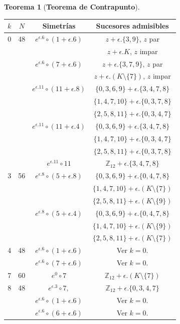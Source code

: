 \documentclass[letterpaper,12pt]{book}
\theoremstyle{definition} \newtheorem{Def}{Definición}[chapter]
\theoremstyle{definition} \newtheorem{Teo}{Teorema}[chapter]
\theoremstyle{definition} \newtheorem{Pro}{Proposición}[chapter]
\theoremstyle{definition} \newtheorem{Lema}{Lema}[chapter]
\begin{document}
\begin{Teo}[\textbf{Teorema de Contrapunto}]
\begin{enumerate}
\begin{table}
\centering
\begin{tabular}{|c|c|c|c|}
\hline
$k$ & $N$ & Simetrías & Sucesores admisibles\\
\hline
0 & 48 & $e^{\epsilon{.}6}\circ (1+\epsilon{.}6)$ & $z+\epsilon.\{3,9\}$, $z$ par\\
& & &$z+\epsilon.K$, $z$ impar\\\cline{3-4}
& &$e^{\epsilon{.}6}\circ (7+\epsilon{.}6)$ & $z+\epsilon.\{3,7,9\}$, $z$ par\\
& & &$z+\epsilon.(K\setminus \{7\})$, $z$ impar\\\cline{3-4}
& &$e^{\epsilon{.}11}\circ(11+\epsilon{.}8)$ & $\{0,3,6,9\}+\epsilon.\{3,4,7,8\}$\\
& & &$\{1,4,7,10\}+\epsilon.\{0,3,7,8\}$\\
& & &$\{2,5,8,11\}+\epsilon.\{0,3,4,7\}$\\\cline{3-4}
& &$e^{\epsilon{.}11}\circ(11+\epsilon{.}4)$ & $\{0,3,6,9\}+\epsilon.\{3,4,7,8\}$\\
& & &$\{1,4,7,10\}+\epsilon.\{0,3,4,7\}$\\
& & &$\{2,5,8,11\}+\epsilon.\{0,3,7,8\}$\\\cline{3-4}
& &$e^{\epsilon{.}11}\circ 11$ & $\mathbb{Z}_{12}+\epsilon.\{3,4,7,8\}$\\
\hline
3 & 56 & $e^{\epsilon{.}8}\circ (5+\epsilon{.}8)$ &$\{0,3,6,9\}+\epsilon.\{0,4,7,8\}$\\
& & &$\{1,4,7,10\}+\epsilon.(K\setminus\{7\})$\\
& & &$\{2,5,8,11\}+\epsilon.(K\setminus\{9\})$\\\cline{3-4}
& &$e^{\epsilon{.}8}\circ (5+\epsilon{.}4)$ & $\{0,3,6,9\}+\epsilon.\{0,4,7,8\}$\\
& & &$\{1,4,7,10\}+\epsilon.(K\setminus\{9\})$\\
& & &$\{2,5,8,11\}+\epsilon.(K\setminus\{7\})$\\
\hline
4 & 48 & $e^{\epsilon{.}6}\circ (1+\epsilon{.}6)$ & Ver $k = 0$.\\\cline{3-4}
& &$e^{\epsilon{.}6}\circ (7+\epsilon{.}6)$ & Ver $k = 0$.\\
\hline
7 & 60 & $e^{0}\circ 7$ & $\mathbb{Z}_{12}+\epsilon.(K\setminus\{7\})$\\
\hline
8 & 48 & $e^{\epsilon{.}3}\circ 7,$ & $\mathbb{Z}_{12}+\epsilon.\{0,3,4,7\}$\\\cline{3-4}
& &$e^{\epsilon{.}6}\circ (1+\epsilon{.}6)$ & Ver $k = 0$.\\\cline{3-4}
& &$e^{\epsilon{.}6}\circ (6+\epsilon{.}6)$ & Ver $k = 0$.\\\cline{3-4}

\end{tabular}
\end{table}
\end{enumerate}
\end{Teo}
\end{document}
